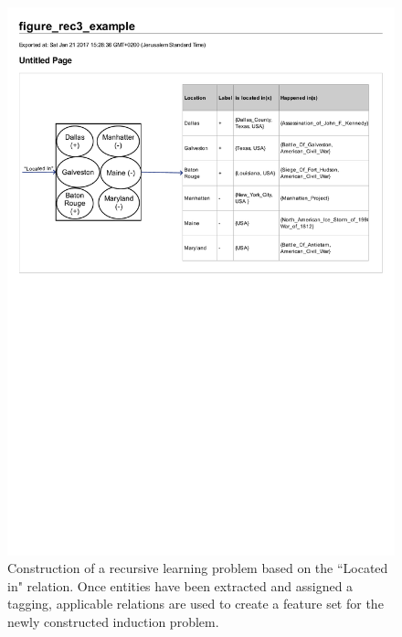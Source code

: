 \documentclass[twoside,11pt]{article}
\theoremstyle{definition}
\begin{document}
 \begin{figure}[!h]
 	\centering
 	\includegraphics[width=\linewidth]{figure_rec3_example}
 	\caption{Construction of a recursive learning problem based on the ``Located in" relation. Once entities have been extracted and assigned a tagging, applicable relations are used to create a feature set for the newly constructed induction problem.}
 	\label{fig:figure_rec3_example}
 \end{figure}
 
\end{document}
